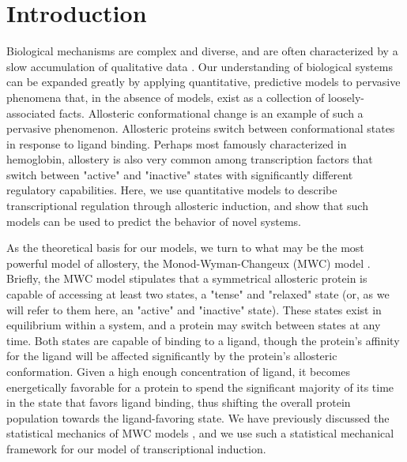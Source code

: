 \section*{Introduction }

Biological mechanisms are complex and diverse, and are often characterized by a slow accumulation of qualitative data . Our understanding of biological systems can be expanded greatly by applying quantitative, predictive models to pervasive phenomena that, in the absence of models, exist as a collection of loosely-associated facts. Allosteric conformational change is an example of such a pervasive phenomenon. Allosteric proteins switch between conformational states in response to ligand binding. Perhaps most famously characterized in hemoglobin, allostery is also very common among transcription factors that switch between "active" and "inactive" states with significantly different regulatory capabilities. Here, we use quantitative models to describe transcriptional regulation through allosteric induction, and show that such models can be used to predict the behavior of novel systems.

As the theoretical basis for our models, we turn to what may be the most powerful model of allostery, the Monod-Wyman-Changeux (MWC) model \cite{MONOD1965}. Briefly, the MWC model stipulates that a symmetrical allosteric protein is capable of accessing at least two states, a "tense" and "relaxed" state (or, as we will refer to them here, an "active" and "inactive" state). These states exist in equilibrium within a system, and a protein may switch between states at any time. Both states are capable of binding to a ligand, though the protein's affinity for the ligand will be affected significantly by the protein's allosteric conformation. Given a high enough concentration of ligand, it becomes energetically favorable for a protein to spend the significant majority of its time in the state that favors ligand binding, thus shifting the overall protein population towards the ligand-favoring state. We have previously discussed the statistical mechanics of MWC models \cite{Marzen2013}, and we use such a statistical mechanical framework for our model of transcriptional induction. 

